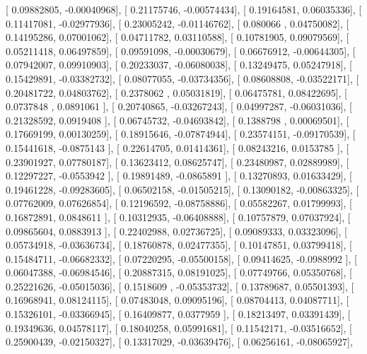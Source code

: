 \documentclass{article}
\begin{document}
       [ 0.09882805, -0.00040968],
       [ 0.21175746, -0.00574434],
       [ 0.19164581,  0.06035336],
       [ 0.11417081, -0.02977936],
       [ 0.23005242, -0.01146762],
       [ 0.080066  ,  0.04750082],
       [ 0.14195286,  0.07001062],
       [ 0.04711782,  0.03110588],
       [ 0.10781905,  0.09079569],
       [ 0.05211418,  0.06497859],
       [ 0.09591098, -0.00030679],
       [ 0.06676912, -0.00644305],
       [ 0.07942007,  0.09910903],
       [ 0.20233037, -0.06080038],
       [ 0.13249475,  0.05247918],
       [ 0.15429891, -0.03382732],
       [ 0.08077055, -0.03734356],
       [ 0.08608808, -0.03522171],
       [ 0.20481722,  0.04803762],
       [ 0.2378062 ,  0.05031819],
       [ 0.06475781,  0.08422695],
       [ 0.0737848 ,  0.0891061 ],
       [ 0.20740865, -0.03267243],
       [ 0.04997287, -0.06031036],
       [ 0.21328592,  0.0919408 ],
       [ 0.06745732, -0.04693842],
       [ 0.1388798 ,  0.00069501],
       [ 0.17669199,  0.00130259],
       [ 0.18915646, -0.07874944],
       [ 0.23574151, -0.09170539],
       [ 0.15441618, -0.0875143 ],
       [ 0.22614705,  0.01414361],
       [ 0.08243216,  0.0153785 ],
       [ 0.23901927,  0.07780187],
       [ 0.13623412,  0.08625747],
       [ 0.23480987,  0.02889989],
       [ 0.12297227, -0.0553942 ],
       [ 0.19891489, -0.0865891 ],
       [ 0.13270893,  0.01633429],
       [ 0.19461228, -0.09283605],
       [ 0.06502158, -0.01505215],
       [ 0.13090182, -0.00863325],
       [ 0.07762009,  0.07626854],
       [ 0.12196592, -0.08758886],
       [ 0.05582267,  0.01799993],
       [ 0.16872891,  0.0848611 ],
       [ 0.10312935, -0.06408888],
       [ 0.10757879,  0.07037924],
       [ 0.09865604,  0.0883913 ],
       [ 0.22402988,  0.02736725],
       [ 0.09089333,  0.03323096],
       [ 0.05734918, -0.03636734],
       [ 0.18760878,  0.02477355],
       [ 0.10147851,  0.03799418],
       [ 0.15484711, -0.06682332],
       [ 0.07220295, -0.05500158],
       [ 0.09414625, -0.0988992 ],
       [ 0.06047388, -0.06984546],
       [ 0.20887315,  0.08191025],
       [ 0.07749766,  0.05350768],
       [ 0.25221626, -0.05015036],
       [ 0.1518609 , -0.05353732],
       [ 0.13789687,  0.05501393],
       [ 0.16968941,  0.08124115],
       [ 0.07483048,  0.09095196],
       [ 0.08704413,  0.04087711],
       [ 0.15326101, -0.03366945],
       [ 0.16409877,  0.0377959 ],
       [ 0.18213497,  0.03391439],
       [ 0.19349636,  0.04578117],
       [ 0.18040258,  0.05991681],
       [ 0.11542171, -0.03516652],
       [ 0.25900439, -0.02150327],
       [ 0.13317029, -0.03639476],
       [ 0.06256161, -0.08065927],
\end{document}
